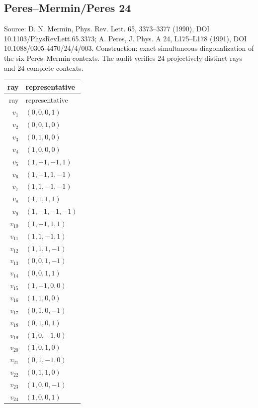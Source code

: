 \subsection{Peres--Mermin/Peres 24}
\begingroup\sloppy Source: D. N. Mermin, Phys. Rev. Lett. 65, 3373--3377 (1990), DOI 10.1103/PhysRevLett.65.3373; A. Peres, J. Phys. A 24, L175--L178 (1991), DOI 10.1088/0305-4470/24/4/003.  Construction: exact simultaneous diagonalization of the six Peres--Mermin contexts. The audit verifies 24 projectively distinct rays and 24 complete contexts.\par\endgroup
\begin{longtable}{@{}r l@{}}
\toprule
ray & representative\\
\midrule
\endfirsthead
\toprule
ray & representative\\
\midrule
\endhead
$v_{1}$ & $(0,0,0,1)$\\
$v_{2}$ & $(0,0,1,0)$\\
$v_{3}$ & $(0,1,0,0)$\\
$v_{4}$ & $(1,0,0,0)$\\
$v_{5}$ & $(1,-1,-1,1)$\\
$v_{6}$ & $(1,-1,1,-1)$\\
$v_{7}$ & $(1,1,-1,-1)$\\
$v_{8}$ & $(1,1,1,1)$\\
$v_{9}$ & $(1,-1,-1,-1)$\\
$v_{10}$ & $(1,-1,1,1)$\\
$v_{11}$ & $(1,1,-1,1)$\\
$v_{12}$ & $(1,1,1,-1)$\\
$v_{13}$ & $(0,0,1,-1)$\\
$v_{14}$ & $(0,0,1,1)$\\
$v_{15}$ & $(1,-1,0,0)$\\
$v_{16}$ & $(1,1,0,0)$\\
$v_{17}$ & $(0,1,0,-1)$\\
$v_{18}$ & $(0,1,0,1)$\\
$v_{19}$ & $(1,0,-1,0)$\\
$v_{20}$ & $(1,0,1,0)$\\
$v_{21}$ & $(0,1,-1,0)$\\
$v_{22}$ & $(0,1,1,0)$\\
$v_{23}$ & $(1,0,0,-1)$\\
$v_{24}$ & $(1,0,0,1)$\\
\bottomrule
\end{longtable}

